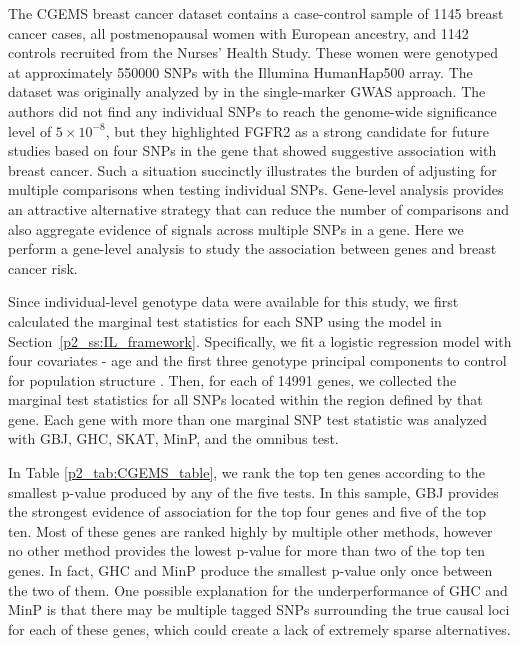 \documentclass[12pt]{article}
\begin{document}
The CGEMS breast cancer dataset contains a case-control sample of
1145 breast cancer cases, all postmenopausal women
with European ancestry, and 1142 controls recruited from the Nurses' Health Study.
These women were genotyped at approximately 550000 SNPs with the Illumina HumanHap500 array.
The dataset was originally analyzed by \citet{CGEMS} in the single-marker GWAS approach.
The authors did not find any individual SNPs to reach the genome-wide significance level of $5\times 10^{-8}$,
but they highlighted FGFR2 as a strong candidate for future studies based on four SNPs in the gene 
that showed suggestive association with breast cancer.
Such a situation succinctly illustrates the burden of adjusting for multiple comparisons when 
testing individual SNPs.
Gene-level analysis provides an attractive alternative strategy that can reduce the number of 
comparisons and also aggregate evidence of signals across multiple SNPs in a gene. 
Here we perform a gene-level analysis to study the association between genes and breast cancer risk.

Since individual-level genotype data were available for this study, we first calculated the 
marginal test statistics for each SNP using the model in Section~\ref{p2_ss:IL_framework}. 
Specifically, we fit a logistic regression model with four covariates - age and the first three 
genotype principal components to control for population structure \citep{Eigenstrat}.
Then, for each of 14991 genes, we collected the marginal test statistics for all SNPs located 
within the region defined by that gene.
Each gene with more than one marginal SNP test statistic was analyzed with 
GBJ, GHC, SKAT, MinP, and the omnibus test.

In Table \ref{p2_tab:CGEMS_table}, we rank the top ten genes according to the smallest p-value produced by any of the five tests.
In this sample, GBJ provides the strongest evidence of association for the top four genes
and five of the top ten. 
Most of these genes are ranked highly by multiple other methods, however no other method provides the 
lowest p-value for more than two of the top ten genes. 
In fact, GHC and MinP produce the smallest p-value only once between the two of them. 
One possible explanation for the underperformance of GHC and MinP is that there may be 
multiple tagged SNPs surrounding the true causal loci for each of these genes, which could
create a lack of extremely sparse alternatives.
\end{document}

